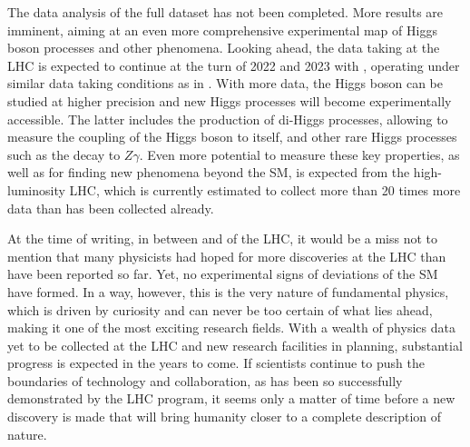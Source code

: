 The data analysis of the full \RunTwo dataset has not been completed. 
More results are imminent, aiming at an even more comprehensive experimental map of Higgs boson processes and other phenomena. 
Looking ahead, the data taking at the LHC is expected to continue at the turn of 2022 and 2023 with \RunThr, operating under similar data taking conditions as in \RunTwo. 
With more data, the Higgs boson can be studied at higher precision and new Higgs processes will become experimentally accessible. The latter includes the production of di-Higgs processes, allowing to measure the coupling of the Higgs boson to itself, and other rare Higgs processes such as the decay to $Z\gamma$. 
Even more potential to measure these key properties, as well as for finding new phenomena beyond the SM, is expected from the high-luminosity LHC, which is currently estimated to collect more than 20 times more data than has been collected already. 


At the time of writing, in between \RunTwo and \RunThr of the LHC, it would be a miss not to mention that many physicists had hoped for more discoveries at the LHC than have been reported so far. 
Yet, no experimental signs of deviations of the SM have formed.
In a way, however, this is the very nature of fundamental physics, which is driven by curiosity and can never be too certain of what lies ahead, making it one of the most exciting research fields. 
With a wealth of physics data yet to be collected at the LHC and new research facilities in planning, substantial progress is expected in the years to come. If scientists continue to push the boundaries of technology and collaboration, as has been so successfully demonstrated by the LHC program, it seems only a matter of time before a new discovery is made that will bring humanity closer to a complete description of nature.


